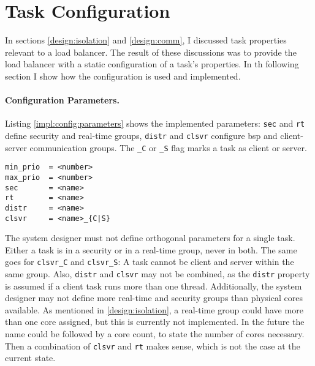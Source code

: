\pagebreak
\section{Task Configuration}
\label{impl:config}

In sections \ref{design:isolation} and \ref{design:comm}, I discussed
task properties relevant to a load balancer.
The result of these discussions was to provide the load balancer with a static
configuration of a task's properties.
In th following section I show how the configuration is used and implemented.

\paragraph{Configuration Parameters.}
Listing \ref{impl:config:parameters} shows the implemented parameters:
\texttt{sec} and \texttt{rt} define security and real-time groups,
\texttt{distr} and \texttt{clsvr} configure \gls{bsp} and client-server
communication groups.
The \texttt{\_C} or \texttt{\_S} flag marks a task as client or server.

\begin{lstlisting}[language={[5.2]Lua}, caption={Implemented set of
configuration parameters.},label={impl:config:parameters}]
min_prio  = <number>
max_prio  = <number>
sec       = <name>
rt        = <name>
distr     = <name>
clsvr     = <name>_{C|S}
\end{lstlisting}

The system designer must not define orthogonal parameters for
a single task.
Either a task is in a security or in a real-time group, never in both.
The same goes for \texttt{clsvr\_C} and \texttt{clsvr\_S}:
A task cannot be client and server within the same group.
Also, \texttt{distr} and \texttt{clsvr} may not be combined, as the
\texttt{distr} property is assumed if a client task runs more than one thread.
Additionally, the system designer may not define more real-time and security
groups than physical cores available.
As mentioned in \ref{design:isolation}, a real-time group could have more than
one core assigned, but this is currently not implemented.
In the future the name could be followed by a core count, to state the number
of cores necessary.
Then a combination of \texttt{clsvr} and \texttt{rt} makes sense, which is not
the case at the current state.

